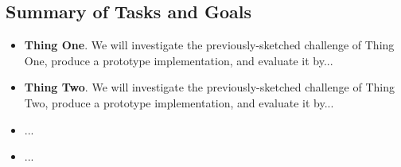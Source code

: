 \subsection{Summary of Tasks and Goals}
\begin{itemize}
\item \textbf{Thing One}.  We will investigate the previously-sketched challenge of Thing One, produce a prototype implementation, and evaluate it by...
\item \textbf{Thing Two}.  We will investigate the previously-sketched challenge of Thing Two, produce a prototype implementation, and evaluate it by...
\item ...
\item ...
\end{itemize}